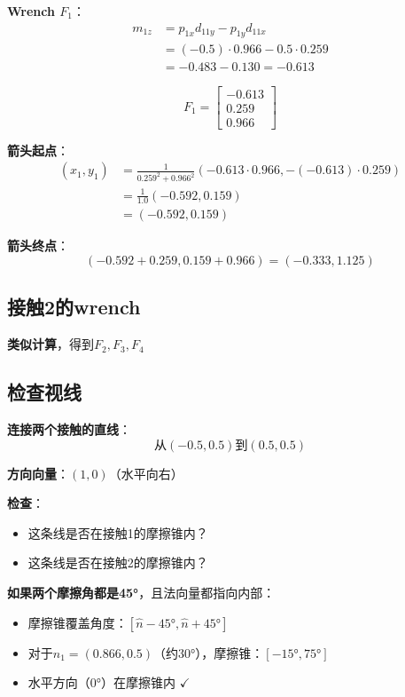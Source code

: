 \documentclass[12pt,a4paper]{article}
\begin{document}
\textbf{Wrench $F_1$}：
\begin{align}
m_{1z} &= p_{1x} d_{11y} - p_{1y} d_{11x} \\
&= (-0.5) \cdot 0.966 - 0.5 \cdot 0.259 \\
&= -0.483 - 0.130 = -0.613
\end{align}

\begin{equation}
F_1 = \begin{bmatrix} -0.613 \\ 0.259 \\ 0.966 \end{bmatrix}
\end{equation}

\textbf{箭头起点}：
\begin{align}
(x_1, y_1) &= \frac{1}{0.259^2 + 0.966^2} (-0.613 \cdot 0.966, -(-0.613) \cdot 0.259) \\
&= \frac{1}{1.0} (-0.592, 0.159) \\
&= (-0.592, 0.159)
\end{align}

\textbf{箭头终点}：
\begin{equation}
(-0.592 + 0.259, 0.159 + 0.966) = (-0.333, 1.125)
\end{equation}

\subsection{接触2的wrench}

\textbf{类似计算}，得到$F_2, F_3, F_4$

\subsection{检查视线}

\textbf{连接两个接触的直线}：
\begin{equation}
\text{从} (-0.5, 0.5) \text{到} (0.5, 0.5)
\end{equation}

\textbf{方向向量}：$(1, 0)$（水平向右）

\textbf{检查}：
\begin{itemize}
\item 这条线是否在接触1的摩擦锥内？
\item 这条线是否在接触2的摩擦锥内？
\end{itemize}

\textbf{如果两个摩擦角都是45°}，且法向量都指向内部：
\begin{itemize}
\item 摩擦锥覆盖角度：$[\hat{n} - 45°, \hat{n} + 45°]$
\item 对于$\hat{n}_1 = (0.866, 0.5)$（约30°），摩擦锥：$[-15°, 75°]$
\item 水平方向（0°）在摩擦锥内 $\checkmark$
\end{itemize}
\end{document}
